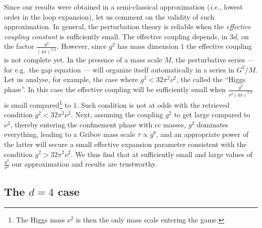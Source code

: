 Since our results were obtained in a semi-classical approximation ({\it i.e.}, lowest order in the loop expansion), let us comment on the validity of such approximation. In general, the perturbation theory is reliable when the \emph{effective coupling constant} is sufficiently small. The effective coupling depends, in $3d$, on the factor $\frac{g^2}{(4\pi)^{3/2}}$. However, since $g^2$ has mass dimension $1$ the effective coupling is not complete yet. In the presence of a mass scale $M$, the perturbative series --- for e.g.~the gap equation --- will organize itself automatically in a series in $G^2/M$. Let us analyse, for example, the case where $g^2 < 32 \pi^2 \nu^2$, the called the ``Higgs phase''. In this case the effective coupling will be sufficiently small when $\frac{g^2}{\nu^2(4\pi)^{3/2}}$ is small compared\footnote{The Higgs mass $\nu^2$ is then the only mass scale entering the game.} to $1$. Such condition is not at odds with the retrieved condition $g^2 < 32 \pi^2 \nu^2$. Next, assuming the coupling $g^2$ to get large compared to $\nu^2$, thereby entering the confinement phase with $cc$ masses, $g^2$ dominates everything, leading to a Gribov mass scale $\tau\propto g^8$, and an appropriate power of the latter will secure a small effective expansion parameter consistent with the condition $g^2 > 32 \pi^2 \nu^2$. We thus find that at sufficiently small and large values of $\frac{g^2}{\nu^2}$ our approximation and results are trustworthy.





















\subsection{The $d=4$ case}

